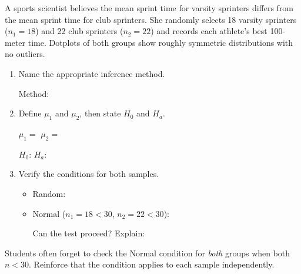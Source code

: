 \documentclass[10pt]{article}
\begin{document}
\namedateperiod

\vspace{0.15in}

A sports scientist believes the mean sprint time for varsity sprinters differs from the
mean sprint time for club sprinters. She randomly selects 18 varsity sprinters
($n_1 = 18$) and 22 club sprinters ($n_2 = 22$) and records each athlete's best
100-meter time. Dotplots of both groups show roughly symmetric distributions with
no outliers.

\begin{enumerate}
  \item Name the appropriate inference method.

        Method: 

  \item Define $\mu_1$ and $\mu_2$, then state $H_0$ and $H_a$.

        $\mu_1 = $  \qquad
        $\mu_2 = $ 

        $H_0$:  \qquad $H_a$: 

  \item Verify the conditions for both samples.
        \begin{itemize}
          \item Random: 
          \item Normal ($n_1 = 18 < 30$, $n_2 = 22 < 30$): 

                Can the test proceed?  \quad Explain: 
        \end{itemize}
\end{enumerate}

\begin{teachernote}
Students often forget to check the Normal condition for \emph{both} groups when both $n < 30$.
Reinforce that the condition applies to each sample independently.
\end{teachernote}
\end{document}
